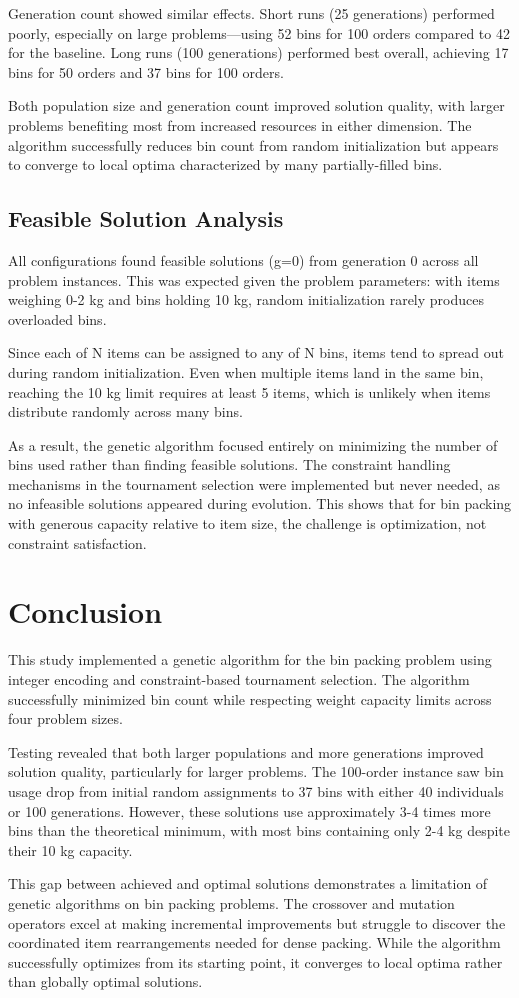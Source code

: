\documentclass[journal,12pt,onecolumn]{IEEEtran}
\begin{document}
Generation count showed similar effects. Short runs (25 generations) performed poorly, especially on large problems—using 52 bins for 100 orders compared to 42 for the baseline. Long runs (100 generations) performed best overall, achieving 17 bins for 50 orders and 37 bins for 100 orders.

Both population size and generation count improved solution quality, with larger problems benefiting most from increased resources in either dimension. The algorithm successfully reduces bin count from random initialization but appears to converge to local optima characterized by many partially-filled bins.

\subsection{Feasible Solution Analysis}

All configurations found feasible solutions (g=0) from generation 0 across all problem instances. This was expected given the problem parameters: with items weighing 0-2 kg and bins holding 10 kg, random initialization rarely produces overloaded bins.

Since each of N items can be assigned to any of N bins, items tend to spread out during random initialization. Even when multiple items land in the same bin, reaching the 10 kg limit requires at least 5 items, which is unlikely when items distribute randomly across many bins.

As a result, the genetic algorithm focused entirely on minimizing the number of bins used rather than finding feasible solutions. The constraint handling mechanisms in the tournament selection were implemented but never needed, as no infeasible solutions appeared during evolution. This shows that for bin packing with generous capacity relative to item size, the challenge is optimization, not constraint satisfaction.

\section{Conclusion}

This study implemented a genetic algorithm for the bin packing problem using integer encoding and constraint-based tournament selection. The algorithm successfully minimized bin count while respecting weight capacity limits across four problem sizes.

Testing revealed that both larger populations and more generations improved solution quality, particularly for larger problems. The 100-order instance saw bin usage drop from initial random assignments to 37 bins with either 40 individuals or 100 generations. However, these solutions use approximately 3-4 times more bins than the theoretical minimum, with most bins containing only 2-4 kg despite their 10 kg capacity.

This gap between achieved and optimal solutions demonstrates a limitation of genetic algorithms on bin packing problems. The crossover and mutation operators excel at making incremental improvements but struggle to discover the coordinated item rearrangements needed for dense packing. While the algorithm successfully optimizes from its starting point, it converges to local optima rather than globally optimal solutions.
\end{document}

